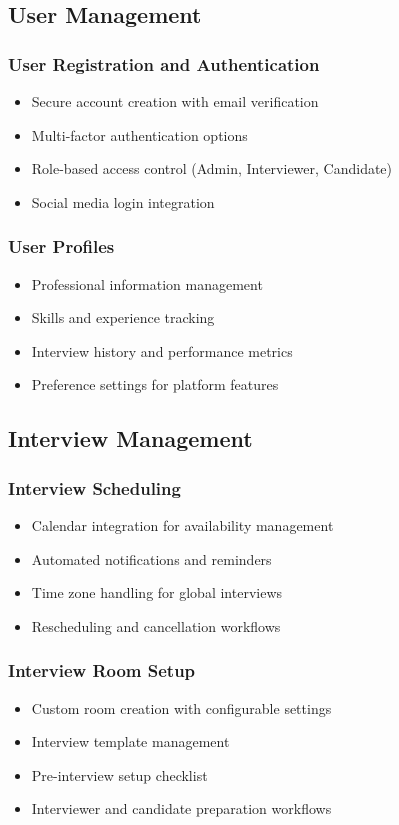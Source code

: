 \documentclass[12pt,a4paper]{report}
\begin{document}
\subsection{User Management}
\subsubsection{User Registration and Authentication}
\begin{itemize}
   \item Secure account creation with email verification
   \item Multi-factor authentication options
   \item Role-based access control (Admin, Interviewer, Candidate)
   \item Social media login integration
\end{itemize}



\subsubsection{User Profiles}
\begin{itemize}
   \item Professional information management
   \item Skills and experience tracking
   \item Interview history and performance metrics
   \item Preference settings for platform features
\end{itemize}

\subsection{Interview Management}
\subsubsection{Interview Scheduling}
\begin{itemize}
   \item Calendar integration for availability management
   \item Automated notifications and reminders
   \item Time zone handling for global interviews
   \item Rescheduling and cancellation workflows
\end{itemize}

\subsubsection{Interview Room Setup}
\begin{itemize}
   \item Custom room creation with configurable settings
   \item Interview template management
   \item Pre-interview setup checklist
   \item Interviewer and candidate preparation workflows
\end{itemize}
\end{document}
